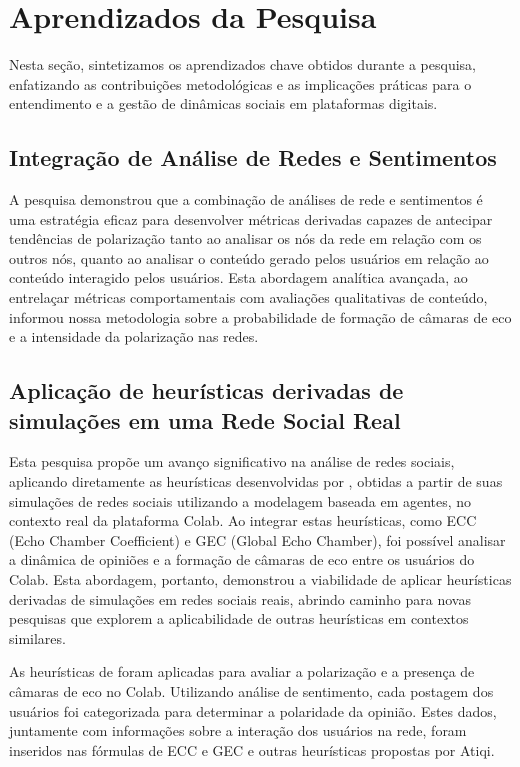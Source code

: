 \section{Aprendizados da Pesquisa}

Nesta seção, sintetizamos os aprendizados chave obtidos durante a pesquisa, enfatizando as contribuições metodológicas e as implicações práticas para o entendimento e a gestão de dinâmicas sociais em plataformas digitais.

\subsection*{Integração de Análise de Redes e Sentimentos}

A pesquisa demonstrou que a combinação de análises de rede e sentimentos é uma estratégia eficaz para desenvolver métricas derivadas capazes de antecipar tendências de polarização tanto ao analisar os nós da rede em relação com os outros nós, quanto ao analisar o conteúdo gerado pelos usuários em relação ao conteúdo interagido pelos usuários. Esta abordagem analítica avançada, ao entrelaçar métricas comportamentais com avaliações qualitativas de conteúdo, informou nossa metodologia sobre a probabilidade de formação de câmaras de eco e a intensidade da polarização nas redes.

\subsection*{Aplicação de heurísticas derivadas de simulações em uma Rede Social Real}

Esta pesquisa propõe um avanço significativo na análise de redes sociais, aplicando diretamente as heurísticas desenvolvidas por , obtidas a partir de suas simulações de redes sociais utilizando a modelagem baseada em agentes, no contexto real da plataforma Colab. Ao integrar estas heurísticas, como ECC (Echo Chamber Coefficient) e GEC (Global Echo Chamber), foi possível analisar a dinâmica de opiniões e a formação de câmaras de eco entre os usuários do Colab. Esta abordagem, portanto, demonstrou a viabilidade de aplicar heurísticas derivadas de simulações em redes sociais reais, abrindo caminho para novas pesquisas que explorem a aplicabilidade de outras heurísticas em contextos similares.

As heurísticas de  foram aplicadas para avaliar a polarização e a presença de câmaras de eco no Colab. Utilizando análise de sentimento, cada postagem dos usuários foi categorizada para determinar a polaridade da opinião. Estes dados, juntamente com informações sobre a interação dos usuários na rede, foram inseridos nas fórmulas de ECC e GEC e outras heurísticas propostas por Atiqi.

